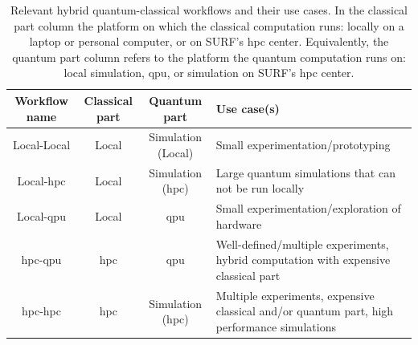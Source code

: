 \begin{table}[ht]
    \centering
    {\renewcommand{\arraystretch}{1.35}
        \begin{tabular}{ c|c|c|>{\centering\arraybackslash}m{4.9cm} }
            Workflow name & Classical part & Quantum part & Use case(s) \\
            \hline
            Local-Local & Local & Simulation (Local) & Small experimentation/prototyping \\
            \hline
            Local-\gls{hpc} & Local & Simulation (\gls{hpc}) & Large quantum simulations that can not be run locally \\
            \hline
            Local-\gls{qpu} & Local & \gls{qpu} & Small experimentation/exploration of hardware \\
            \hline
            \gls{hpc}-\gls{qpu} & \gls{hpc} & \gls{qpu} & Well-defined/multiple experiments, hybrid computation with expensive classical part \\
            \hline
            \gls{hpc}-\gls{hpc} & \gls{hpc} & Simulation (\gls{hpc}) & Multiple experiments, expensive classical and/or quantum part, high performance simulations \\
        \end{tabular}
    }
    \caption[Relevant hybrid quantum-classical workflows and their use cases.]{
        Relevant hybrid quantum-classical workflows and their use cases.
        In the classical part column the platform on which the classical computation runs: locally on a laptop or personal computer, or on SURF's \gls{hpc} center.
        Equivalently, the quantum part column refers to the platform the quantum computation runs on: local simulation, \gls{qpu}, or simulation on SURF's \gls{hpc} center.
    }
    \label{table:hqca-workflows}
\end{table}

